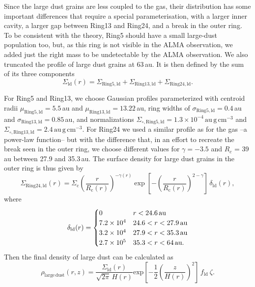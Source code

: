 \documentclass[fleqn,usenatbib,useAMS]{mnras}
\begin{document}
Since the large dust grains are less coupled to the gas, their distribution has some important differences that require a special parameterisation, with a larger inner cavity, a larger gap between Ring13 and Ring24, and a break in the outer ring. To be consistent with the theory, Ring5 should have a small large-dust population too, but, as this ring is not visible in the ALMA observation, we added just the right mass to be undetectable by the ALMA observation. We also truncated the profile of large dust grains at 63\,au. It is then defined by the sum of its three components
\begin{equation}
  \Sigma_{\mathrm{ld}}(r) = \Sigma_{\mathrm{Ring5,ld}} + 
  \Sigma_{\mathrm{Ring13,ld}} + \Sigma_{\mathrm{Ring24,ld}}.
\end{equation}

For Ring5 and Ring13, we choose Gaussian profiles parameterized with centroid radii $\mu_{\mathrm{Ring5, ld}}=5.5$\,au and $\mu_{\mathrm{Ring13, ld}}=13.22$\,au, ring widths of $\sigma_{\mathrm{Ring5,ld}}=0.4$\,au and $\sigma_{\mathrm{Ring13,ld}}=0.85$\,au, and normalizations $\Sigma_{\circ,\mathrm{Ring5,ld}}=1.3\times10^{-4}\,\mathrm{au\,g\,cm^{-3}}$ and $\Sigma_{\circ,\mathrm{Ring13,ld}}=2.4\,\mathrm{au\,g\,cm^{-3}}$. For Ring24 we used a similar profile as for the gas --a power-law function-- but with the difference that, in an effort to recreate the break seen in the outer ring, we choose different values for $\gamma = -3.5$ and $R_c$ = 39\,au between 27.9 and 35.3\,au. The surface density for large dust grains in the outer ring is thus given by
\begin{equation}
    \Sigma_{\mathrm{Ring24,ld}}(r) = \Sigma_{\mathrm{c}} \left(\frac{r}{R_{\mathrm{c}}(r)}\right)^{-\gamma(r)} \exp\left[-\left(\frac{r}{R_{\mathrm{c}}(r)}\right)^{2-\gamma}\right]\,\delta_{\mathrm{ld}}(r),
\end{equation}
where
\begin{equation}
  \delta_{\mathrm{ld}}(r) =
  \begin{cases}
  0                 & r < 24.6\text{\,au} \\
  7.2 \times10^{4} & 24.6 < r < 27.9\text{\,au} \\
  3.2 \times10^{4} & 27.9 < r < 35.3\text{\,au} \\
  2.7 \times10^{5} & 35.3 < r < 64\text{\,au.} \\
  \end{cases}
\end{equation}
Then the final density of large dust can be calculated as
\begin{equation}
\rho_{\mathrm{large\,dust}}(r,z)=
\frac{\Sigma_{\mathrm{ld}}(r)}{\sqrt{2\pi} \, H(r)} \mathrm{exp}\left[-\frac{1}{2} \left(\frac{z}{H(r)}\right)^2\right] \, f_{\mathrm{ld}} \: \zeta .
\end{equation}
\end{document}

